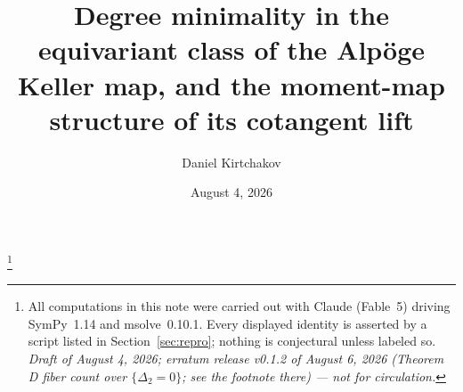 \documentclass[11pt]{amsart}
\theoremstyle{plain}
\theoremstyle{definition}
\theoremstyle{remark}
\begin{document}
\title[Degree minimality and the moment map for the Alp\"oge Keller
map]{Degree minimality in the equivariant class of the Alp\"oge Keller map,
and the moment-map structure of its cotangent lift}

\author{Daniel Kirtchakov}
\address{Independent researcher}
\thanks{All computations in this note were carried out with Claude (Fable~5)
driving SymPy~1.14 and msolve~0.10.1. Every displayed identity is asserted by
a script listed in Section~\ref{sec:repro}; nothing is conjectural unless
labeled so. \emph{Draft of August 4, 2026; erratum release v0.1.2 of
August 6, 2026 (Theorem D fiber count over $\{\Delta_{2}=0\}$; see the
footnote there) --- not for circulation.}}


\date{August 4, 2026}
\end{document}
